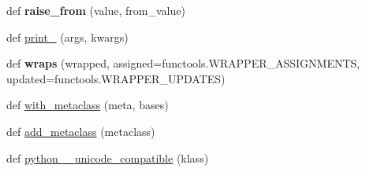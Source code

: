 \begin{DoxyCompactItemize}
\item 
\mbox{\label{namespacepkg__resources_1_1__vendor_1_1six_a6b8e4352b533b710e502e9d5939f734d}} 
def {\bfseries raise\+\_\+from} (value, from\+\_\+value)
\item 
def \hyperlink{namespacepkg__resources_1_1__vendor_1_1six_a75bc73d34d958d7723c48b5586d91313}{print\+\_\+} (args, kwargs)
\item 
\mbox{\label{namespacepkg__resources_1_1__vendor_1_1six_a48e21f0a8566ce5330a55ad55aa891e2}} 
def {\bfseries wraps} (wrapped, assigned=functools.\+W\+R\+A\+P\+P\+E\+R\+\_\+\+A\+S\+S\+I\+G\+N\+M\+E\+N\+TS, updated=functools.\+W\+R\+A\+P\+P\+E\+R\+\_\+\+U\+P\+D\+A\+T\+ES)
\item 
def \hyperlink{namespacepkg__resources_1_1__vendor_1_1six_a81f405813a1ac39dd5a1fbc362f9934a}{with\+\_\+metaclass} (meta, bases)
\item 
def \hyperlink{namespacepkg__resources_1_1__vendor_1_1six_ade9cb2d76fb1195e958ab8656a3b6a29}{add\+\_\+metaclass} (metaclass)
\item 
def \hyperlink{namespacepkg__resources_1_1__vendor_1_1six_aec1ccf1db6cd3a0b554993240a1ca321}{python\+\_\+\_\+unicode\+\_\+compatible} (klass)
\end{DoxyCompactItemize}
